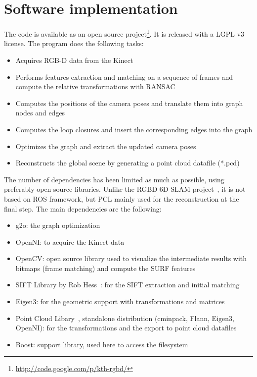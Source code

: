 \clearpage
\section{Software implementation}

The code is available as an open source project\footnote{\url{http://code.google.com/p/kth-rgbd/}}. It is released with a LGPL v3 license.
The program does the following tasks:

\begin{itemize}
\item Acquires RGB-D data from the Kinect
\item Performs features extraction and matching on a sequence of frames and compute the relative transformations with \gls{RANSAC}
\item Computes the positions of the camera poses and translate them into graph nodes and edges
\item Computes the loop closures and insert the corresponding edges into the graph
\item Optimizes the graph and extract the updated camera poses
\item Reconstructs the global scene by generating a point cloud datafile (*.pcd)
\end{itemize}

The number of dependencies has been limited as much as possible, using preferably open-source libraries. Unlike the RGBD-6D-SLAM project~\cite{engelhard11euron-workshop}, it is not based on \gls{ROS} framework, but \gls{PCL} mainly used for the reconstruction at the final step. The main dependencies are the following:
\begin{itemize}
\item g2o: the graph optimization
\item OpenNI: to acquire the Kinect data
\item OpenCV: open source library used to visualize the intermediate results with bitmaps (frame matching) and compute the \gls {SURF} features
\item SIFT Library by Rob Hess~\cite{hess_sift}: for the \gls{SIFT} extraction and initial matching
\item Eigen3: for the geometric support with transformations and matrices
\item Point Cloud Libary~\cite{Rusu_ICRA2011_PCL}, standalone distribution (cminpack, Flann, Eigen3, OpenNI): for the transformations and the export to point cloud datafiles
\item Boost: support library, used here to access the filesystem
\end{itemize}

